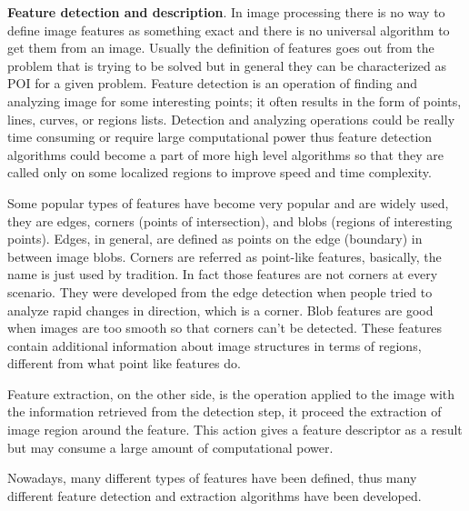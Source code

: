 \documentclass[../../../../main]{subfiles}
\begin{document}
\textbf{Feature detection and description}. In image processing there is no way to define image features as something exact and there is no universal algorithm to get them from an image. Usually the definition of features goes out from the problem that is trying to be solved but in general they can be characterized as \ac{POI} for a given problem. 
Feature detection is an operation of finding and analyzing image for some interesting points; it often results in the form of points, lines, curves, or regions lists. Detection and analyzing operations could be really time consuming or require large computational power thus feature detection algorithms could become a part of more high level algorithms so that they are called only on some localized regions to improve speed and time complexity. 

Some popular types of features have become very popular and are widely used, they are edges, corners (points of intersection), and blobs (regions of interesting points).
Edges, in general, are defined as points on the edge (boundary) in between image blobs. Corners are referred as point-like features, basically, the name is just used by tradition. In fact those features are not corners at every scenario. They were developed from the edge detection when people tried to analyze rapid changes in direction, which is a corner. Blob features are good when images are too smooth so that corners can't be detected. These features contain additional information about image structures in terms of regions, different from what point like features do.

Feature extraction, on the other side, is the operation applied to the image with the information retrieved from the detection step, it proceed the extraction of image region around the feature. This action gives a feature descriptor as a result but may consume a large amount of computational power.

Nowadays, many different types of features have been defined, thus many different feature detection and extraction algorithms have been developed.
\end{document}
